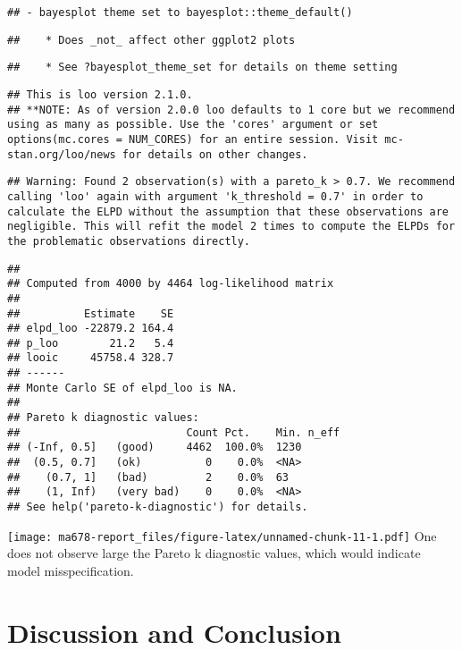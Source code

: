 \documentclass[]{article}
\begin{document}
\begin{verbatim}
## - bayesplot theme set to bayesplot::theme_default()
\end{verbatim}

\begin{verbatim}
##    * Does _not_ affect other ggplot2 plots
\end{verbatim}

\begin{verbatim}
##    * See ?bayesplot_theme_set for details on theme setting
\end{verbatim}

\begin{verbatim}
## This is loo version 2.1.0.
## **NOTE: As of version 2.0.0 loo defaults to 1 core but we recommend using as many as possible. Use the 'cores' argument or set options(mc.cores = NUM_CORES) for an entire session. Visit mc-stan.org/loo/news for details on other changes.
\end{verbatim}

\begin{verbatim}
## Warning: Found 2 observation(s) with a pareto_k > 0.7. We recommend calling 'loo' again with argument 'k_threshold = 0.7' in order to calculate the ELPD without the assumption that these observations are negligible. This will refit the model 2 times to compute the ELPDs for the problematic observations directly.
\end{verbatim}

\begin{verbatim}
## 
## Computed from 4000 by 4464 log-likelihood matrix
## 
##          Estimate    SE
## elpd_loo -22879.2 164.4
## p_loo        21.2   5.4
## looic     45758.4 328.7
## ------
## Monte Carlo SE of elpd_loo is NA.
## 
## Pareto k diagnostic values:
##                          Count Pct.    Min. n_eff
## (-Inf, 0.5]   (good)     4462  100.0%  1230      
##  (0.5, 0.7]   (ok)          0    0.0%  <NA>      
##    (0.7, 1]   (bad)         2    0.0%  63        
##    (1, Inf)   (very bad)    0    0.0%  <NA>      
## See help('pareto-k-diagnostic') for details.
\end{verbatim}

\texttt{[image: ma678-report\_files/figure-latex/unnamed-chunk-11-1.pdf]}
One does not observe large the Pareto k diagnostic values, which would
indicate model misspecification.

\hypertarget{discussion-and-conclusion}{%
\section{Discussion and Conclusion}\label{discussion-and-conclusion}}
\end{document}
